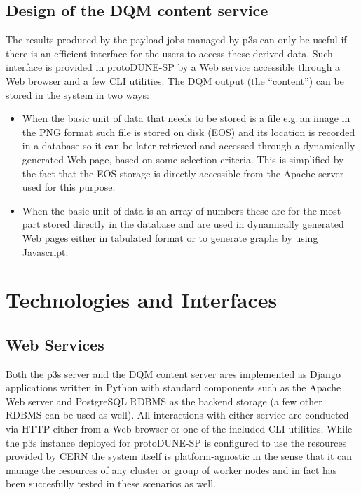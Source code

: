 \documentclass{webofc}
\newcommand{\pd}{protoDUNE\xspace}
\begin{document}
\subsection{Design of the DQM content service}
The results produced by the payload jobs managed by p3s can only be useful if there is an
efficient interface for the users to access these derived data. Such interface is provided in \pd-SP
by a Web service accessible through a Web browser and a few CLI utilities.
The DQM output (the ``content'') can be stored in the system in two ways:
\begin{itemize}

\item When the basic unit of data that needs to be stored is a file e.g.\,an image in the PNG format such
file is stored on disk (EOS) and its location is recorded in a database so it can be later retrieved
and accessed through a dynamically generated Web page,  based on some selection criteria.
This is simplified by the fact that the EOS storage is directly accessible from the Apache server
used for this purpose.

\item When the basic unit of data is an array of numbers these are for the most part stored directly
in the database and are used in dynamically generated Web pages either in tabulated format or
to generate graphs by using Javascript.

\end{itemize}



\section{Technologies and Interfaces}
\subsection{Web Services}

Both the p3s server and the DQM content server ares implemented as Django
\cite{django} applications written in Python with standard components such
as the Apache Web server and PostgreSQL RDBMS as the backend storage
(a few other RDBMS can be used as well). All interactions with either service
are conducted via HTTP either from a Web browser or one of the included CLI utilities.
While the p3s instance deployed for \pd-SP is configured to use
the resources provided by CERN the system itself is platform-agnostic in the sense that it can manage
the resources of any cluster or group of worker nodes and in fact has been succesfully tested
in these scenarios as well.
\end{document}
